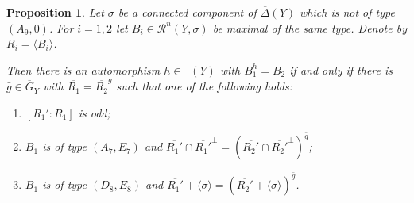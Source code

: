 \documentclass[a4paper]{amsart}
\theoremstyle{definition}
\theoremstyle{plain}
\newtheorem{proposition}[definition]{Proposition}
\DeclareMathOperator{\aut}{Aut^*}
\newcommand{\R}{\mathcal{R}}
\newcommand{\Gbar}{\overline{G}}
\newcommand{\DeltabarY}{\overline{\Delta}(Y)}
\begin{document}
\begin{proposition}\label{prop:same_AutY_orbit}
 Let $\sigma$ be a connected component of $\DeltabarY$ which is not of type $(A_9, 0)$.
 For $i=1,2$ let $B_i \in \R^n(Y,\sigma)$ be maximal of the same type. Denote by $R_i=\langle B_i \rangle$.

 Then there is an automorphism $h \in \aut(Y)$ with
 $B_1^h = B_2$ if and only if there is $\bar g \in \Gbar_Y$ with $\overline{R_1}=\overline{R_2}^g$ such that one of the following holds:
 \begin{enumerate}
  \item $[R_1':R_1]$ is odd;
  \item $B_1$ is of type $(A_7,E_7)$ and $\overline{R_1'}\cap \overline{R_1'}^\perp = \left(\overline{R_2'}\cap \overline{R_2'}^\perp\right)^{\bar g}$;
  \item $B_1$ is of type $(D_8,E_8)$ and $\overline{R_1'}+\langle \sigma \rangle = \left(\overline{R_2'}+\langle \sigma \rangle\right)^{\bar g}$.
 \end{enumerate}
\end{proposition}
\end{document}
